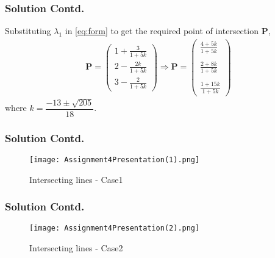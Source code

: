 \documentclass{beamer}
\newcommand{\myvec}[1]{\ensuremath{\begin{pmatrix}#1\end{pmatrix}}}
\renewcommand{\vec}[1]{\mathbf{#1}}
\begin{document}
\begin{frame}
\frametitle{Solution Contd.}
Substituting $\lambda_{1}$ in \eqref{eq:form} to get the required point of intersection $\vec{P}$,
\begin{align}
    \vec{P}=\myvec{1+\frac{3}{1+5k}\\
    2-\frac{2k}{1+5k}\\
    3-\frac{2}{1+5k}}\Rightarrow \vec{P}=\myvec{\frac{4+5k}{1+5k}\\\\
    \frac{2+8k}{1+5k}\\\\
    \frac{1+15k}{1+5k}}
\end{align}
where $k=\dfrac{-13\pm \sqrt{205}}{18}$.
\end{frame}

\begin{frame}
\frametitle{Solution Contd.}
\begin{figure}[!h]
 \centering
 \texttt{[image: Assignment4Presentation(1).png]}
 \caption{Intersecting lines - Case1}
 \label{plot}
\end{figure}
\end{frame}

\begin{frame}
\frametitle{Solution Contd.}
\begin{figure}[!h]
 \centering
 \texttt{[image: Assignment4Presentation(2).png]}
 \caption{Intersecting lines - Case2}
 \label{plot}
\end{figure}
\end{frame}
\end{document}
